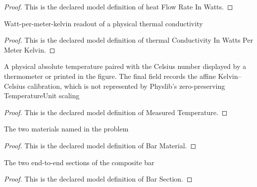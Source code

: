 \begin{proof}
  This is the declared model definition of heat Flow Rate In Watts.
\end{proof}
\begin{definition}
  \label{def:physics:phyx-mini-0467:phyxminiproblems-problemphyxmini0467-thermalconductivityinwattspermeterkelvin}
  Watt-per-meter-kelvin readout of a physical thermal conductivity
\end{definition}
\begin{proof}
  This is the declared model definition of thermal Conductivity In Watts Per Meter Kelvin.
\end{proof}
\begin{definition}
  \label{def:physics:phyx-mini-0467:phyxminiproblems-problemphyxmini0467-measuredtemperature}
  A physical absolute temperature paired with the Celsius number displayed by a thermometer or printed in the figure. The final field records the affine Kelvin--Celsius calibration, which is not represented by Physlib's zero-preserving TemperatureUnit scaling
\end{definition}
\begin{proof}
  This is the declared model definition of Measured Temperature.
\end{proof}
\begin{definition}
  \label{def:physics:phyx-mini-0467:phyxminiproblems-problemphyxmini0467-barmaterial}
  The two materials named in the problem
\end{definition}
\begin{proof}
  This is the declared model definition of Bar Material.
\end{proof}
\begin{definition}
  \label{def:physics:phyx-mini-0467:phyxminiproblems-problemphyxmini0467-barsection}
  The two end-to-end sections of the composite bar
\end{definition}
\begin{proof}
  This is the declared model definition of Bar Section.
\end{proof}
